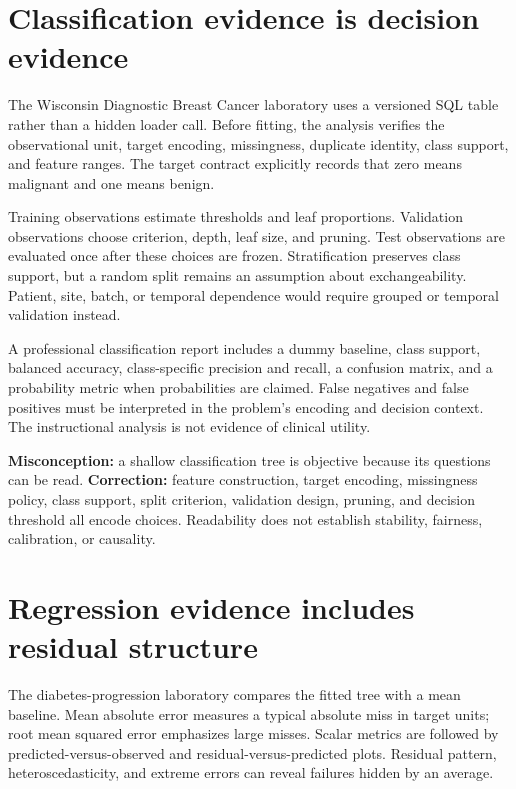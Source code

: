 \section{Classification evidence is decision evidence}

The Wisconsin Diagnostic Breast Cancer laboratory uses a versioned SQL table
rather than a hidden loader call. Before fitting, the analysis verifies the
observational unit, target encoding, missingness, duplicate identity, class
support, and feature ranges. The target contract explicitly records that zero
means malignant and one means benign.

Training observations estimate thresholds and leaf proportions. Validation
observations choose criterion, depth, leaf size, and pruning. Test observations
are evaluated once after these choices are frozen. Stratification preserves
class support, but a random split remains an assumption about exchangeability.
Patient, site, batch, or temporal dependence would require grouped or temporal
validation instead.

A professional classification report includes a dummy baseline, class support,
balanced accuracy, class-specific precision and recall, a confusion matrix, and
a probability metric when probabilities are claimed. False negatives and false
positives must be interpreted in the problem's encoding and decision context.
The instructional analysis is not evidence of clinical utility.

\begin{misconceptionbox}
\textbf{Misconception:} a shallow classification tree is objective because its
questions can be read. \textbf{Correction:} feature construction, target
encoding, missingness policy, class support, split criterion, validation design,
pruning, and decision threshold all encode choices. Readability does not
establish stability, fairness, calibration, or causality.
\end{misconceptionbox}

\section{Regression evidence includes residual structure}

The diabetes-progression laboratory compares the fitted tree with a mean
baseline. Mean absolute error measures a typical absolute miss in target units;
root mean squared error emphasizes large misses. Scalar metrics are followed by
predicted-versus-observed and residual-versus-predicted plots. Residual pattern,
heteroscedasticity, and extreme errors can reveal failures hidden by an average.


